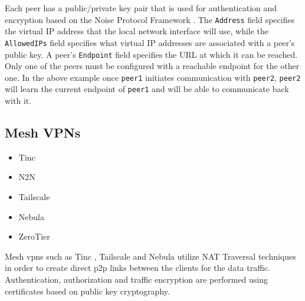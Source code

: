 Each peer has a public/private key pair that is used for authentication
and encryption based on the Noise Protocol Framework
\autocite{noiseDocs}. The \texttt{Address} field specifies the virtual
IP address that the local network interface will use, while the
\texttt{AllowedIPs} field specifies what virtual IP addresses are
associated with a peer's public key. A peer's \texttt{Endpoint} field
specifies the URL at which it can be reached. Only one of the peers must
be configured with a reachable endpoint for the other one. In the above
example once \texttt{peer1} initiates communication with \texttt{peer2},
\texttt{peer2} will learn the current endpoint of \texttt{peer1} and
will be able to communicate back with it.

\hypertarget{thesis__020-related-work.md__mesh-vpns}{%
\subsection{Mesh VPNs}\label{thesis__020-related-work.md__mesh-vpns}}

\begin{itemize}
\tightlist
\item
  Tinc
\item
  N2N
\item
  Tailscale
\item
  Nebula
\item
  ZeroTier
\end{itemize}

Mesh \glspl{vpn} such as Tinc \autocite{tincDocs}, Tailscale
\autocite{tailscaleDocs} and Nebula \autocite{nebulaDocs} utilize NAT
Traversal techniques in order to create direct \gls{p2p} links between
the clients for the data traffic. Authentication, authorization and
traffic encryption are performed using certificates based on public key
cryptography.

